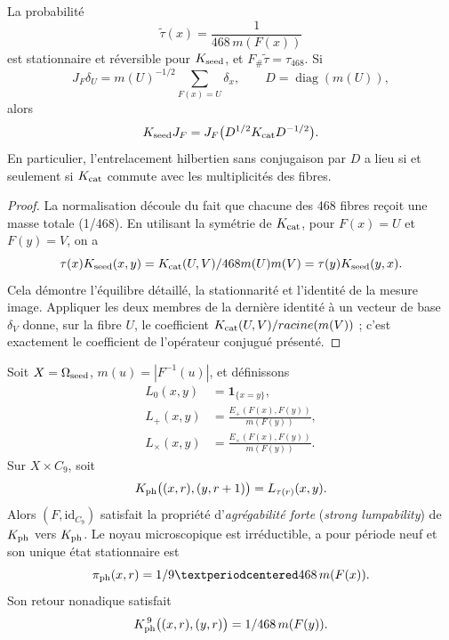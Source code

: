 \begin{theorem}
\label{thm:elevacion-reversible-cociente}
La probabilité
\[
 \widetilde\tau(x)
 =\frac1{468\,m(F(x))}
\]
est stationnaire et réversible pour \(K_{\rm seed}\), et
\(F_\#\widetilde\tau=\tau_{468}\). Si
\[
 J_F\delta_U
 =m(U)^{-1/2}\sum_{F(x)=U}\delta_x,
 \qquad
 D=\operatorname{diag}(m(U)),
\]
alors
\[
 K_{\rm seed}J_F
 =J_F\bigl(D^{1/2}K_{\rm cat}D^{-1/2}\bigr).
\]
En particulier, l'entrelacement hilbertien sans conjugaison par \(D\)
a lieu si et seulement si \(K_{\rm cat}\) commute avec les multiplicités des
fibres.
\end{theorem}

\begin{proof}
La normalisation découle du fait que chacune des 468 fibres reçoit une masse
totale (1/468). En utilisant la symétrie de \(K_{\rm cat}\), pour
\(F(x)=U\) et \(F(y)=V\), on a
\[
 \widetilde\tau(x)K_{\rm seed}(x,y)
 =\frac{K_{\rm cat}(U,V)}{468m(U)m(V)}
 =\widetilde\tau(y)K_{\rm seed}(y,x).
\]
Cela démontre l'équilibre détaillé, la stationnarité et l'identité de la
mesure image.
Appliquer les deux membres de la dernière identité à un vecteur de base
\(\delta_V\) donne, sur la fibre \(U\), le coefficient
\(K_{\rm cat}(U,V)/\sqrt{m(V)}\) ; c'est exactement le coefficient de
l'opérateur conjugué présenté.
\end{proof}

\begin{theorem}
\label{thm:elevacion-fase-semillas}
Soit \(X=\Omega_{\rm seed}\), \(m(u)=|F^{-1}(u)|\), et définissons
\[
\begin{aligned}
 L_0(x,y)&=\mathbf1_{\{x=y\}},\\
 L_+(x,y)&=\frac{E_+(F(x),F(y))}{m(F(y))},\\
 L_\times(x,y)&=\frac{E_\times(F(x),F(y))}{m(F(y))}.
\end{aligned}
\]
Sur \(X\times C_9\), soit
\[
 \widehat{\mathcal K}_{\rm ph}\bigl((x,r),(y,r+1)\bigr)
 =L_{\tau(r)}(x,y).
\]
Alors \((F,\mathrm{id}_{C_9})\) satisfait la propriété
d'\emph{agrégabilité forte} (\emph{strong lumpability}) de
\(\widehat{\mathcal K}_{\rm ph}\) vers \(\mathcal K_{\rm ph}\). Le noyau
microscopique est irréductible, a pour période neuf et son unique état
stationnaire est
\[
 \widetilde\pi_{\rm ph}(x,r)
 =\frac1{9\cdot468\,m(F(x))}.
\]
Son retour nonadique satisfait
\[
 \widehat{\mathcal K}_{\rm ph}^{\,9}
 \bigl((x,r),(y,r)\bigr)
 =\frac1{468\,m(F(y))}.
\]
\end{theorem}


